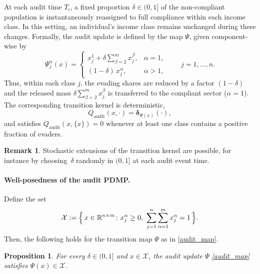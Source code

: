 \documentclass[11pt]{article}
\theoremstyle{plain}
\newtheorem{proposition}{Proposition}
\theoremstyle{definition}
\newtheorem{remark}{Remark}
\newcommand{\1}{\mathbf{1}}
\begin{document}
At each audit time $T_i$, a fixed proportion $\delta \in (0,1]$ of the non-compliant population is instantaneously reassigned to full compliance within each income class. In this setting, an individual's income class remains unchanged during these changes. Formally, the audit update is defined by the map $\Psi$, given component-wise by
\begin{equation}\label{audit_map}
  \Psi^\alpha_j(x) =
  \begin{cases}
    x^1_j + \delta \displaystyle\sum_{\beta=2}^m x^\beta_j, & \alpha = 1, \\[1.5ex]
    (1-\delta)\,x^\alpha_j, & \alpha > 1,
  \end{cases}
  \qquad j = 1, \dots, n.
\end{equation}
Thus, within each class $j$, the evading shares are reduced by a factor $(1-\delta)$ and the released mass $\delta \sum_{\beta=2}^{m} x_j^\beta$ is transferred to the compliant sector ($\alpha=1$). 
The corresponding transition kernel is deterministic,
\begin{equation*}
   Q_{\text{audit}}(x,\cdot) = \boldsymbol{\delta}_{\Psi(x)}(\cdot), %
\end{equation*}
and satisfies $Q_{\text{audit}}(x,\{x\})=0$ whenever %
at least one class contains a positive fraction of evaders.

\begin{remark}
    Stochastic extensions of the transition kernel are possible, for instance by choosing~$\delta$ randomly in $(0,1]$ at each audit event time.
\end{remark}

\paragraph{Well-posedness of the audit PDMP.}

Define the set
\begin{equation}
  \mathcal{X} := \Bigl\{\, x \in \mathbb{R}^{n \times m} \colon x_j^\alpha \geq 0, \
   \sum_{j=1}^n \sum_{\alpha=1}^m x_j^\alpha = 1 \,\Bigr\}. 
   \label{State_space}
\end{equation}
Then, the following holds for the transition map $\Psi$ as in \eqref{audit_map}.

\begin{proposition}\label{prop:audit}
For every $\delta \in (0,1]$ and $x \in \mathcal{X}$, the audit update $\Psi$ \eqref{audit_map} satisfies $\Psi(x)\in \mathcal{X}$. 
\end{proposition}
\end{document}
